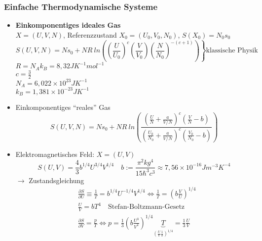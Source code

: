 \documentclass[10pt]{scrartcl}
\begin{document}
\begin{fleqn}
\subsubsection{Einfache Thermodynamische Systeme}
\begin{itemize}
  \item \textbf{Einkomponentiges ideales Gas}\\
   $X=(U,V,N)$, Referenzzustand $X_0=(U_0,V_0,N_0)$, $S(X_0)=N_0s_0$
   \begin{equation}
   S(U,V,N)=Ns_0 +NR \ ln\left(\left.\left(\frac{U}{U_0}\right)^c\left(\frac{V}{V_0}\right)\left(\frac{N}{N_0}\right)^{-(c+1)}\right)\right\} \text{klassische Physik}
   \end{equation}
   $R=N_Ak_B=8,32JK^{-1}mol^{-1}$\\
   $c= \frac{3}{2}$\\
   $N_A=6,022 \times 10^{23}JK^{-1}$\\
   $k_B=1,381 \times 10^{-23}JK^{-1}$\\
  \item Einkomponentiges ``reales'' Gas
   \begin{equation}
   S(U,V,N)=Ns_0 + NR \ ln \left(\frac{\left(\frac{U}{N}+\frac{a}{V/N}\right)^c\left(\frac{V}{N} -b\right)}{\left(\frac{U_0}{N_0} + \frac{a}{V/N}\right)^c \left(\frac{V_0}{N_0}-b\right)}\right)
   \end{equation}
  \item Elektromagnetisches Feld: $X=(U,V)$\\
   \begin{equation}
    S(U,V)= \frac{4}{3}b^{1/4} U^{3/4}V^{1/4} \quad b:= \frac{\pi^2kg^4}{15 \hbar^3 c^3} \approx 7,56 \times 10^{-16} Jm^{-3}K^{-4}
    \end{equation}
   $\rightarrow$ Zustandsgleichung
   \begin{equation}
   \begin{aligned}
    &\frac{\partial S}{\partial U} \equiv \frac{1}{T} = b^{1/4} U^{-1/4} V^{1/4} \Leftrightarrow \frac{1}{T}=\left(b\frac{V}{U}\right)^{1/4}\\
    &\frac{U}{V}=bT^4 \quad \text{Stefan-Boltzmann-Gesetz}\\
    &\frac{\partial S }{\partial V}=\frac{p}{T} \Leftrightarrow p=\frac{1}{3}\left(b\frac{U^3}{V^3}\right)^{1/4}\underbrace{T}_{\left(\frac{U}{V}\frac{1}{b}\right)^{1/4}}=\frac{1}{3}\frac{U}{V}
   \end{aligned}
   \end{equation}
\end{itemize}

\end{fleqn}
\end{document}

